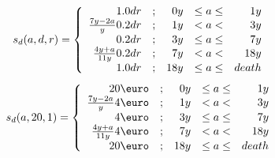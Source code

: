\begin{equation} \label{eq:sup_gross} \index{social support}
s_d(a,d,r) = \left\lbrace
 \begin{array}{rlrcr}
			1.0dr	&;& 0y &\leq a \leq&  1y\\
 \frac {7y-2a} y	0.2dr	&;& 1y &  <  a   < &  3y\\
			0.2dr	&;& 3y &\leq a \leq&  7y\\
 \frac {4y+a} {11y}	0.2dr	&;& 7y &  <  a   < & 18y\\
			1.0dr	&;&18y &\leq a \leq&death
 \end{array}
 \right.
\end{equation}
\begin{equation} \label{eq:sup_gross6} \index{social support}
s_d(a,20,1) = \left\lbrace
 \begin{array}{rlrcr}
			20\euro	&;& 0y &\leq a \leq&  1y\\
 \frac {7y-2a} y	 4\euro	&;& 1y &  <  a   < &  3y\\
			 4\euro	&;& 3y &\leq a \leq&  7y\\
 \frac {4y+a} {11y}	 4\euro	&;& 7y &  <  a   < & 18y\\
			20\euro	&;&18y &\leq a \leq&death
 \end{array}
 \right.
\end{equation}
